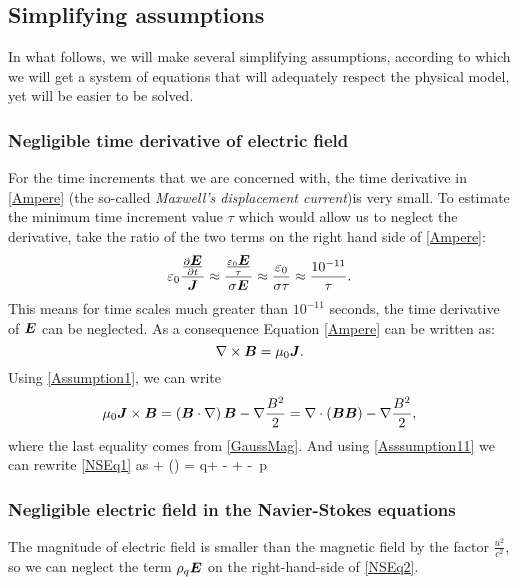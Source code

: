 \subsection{Simplifying assumptions}
In what follows, we will make several simplifying assumptions, according to which we will get a system of equations that will adequately respect the physical model, yet will be easier to be solved.
\subsubsection{Negligible time derivative of electric field}
For the time increments that we are concerned with, the time derivative in \ref{Ampere} (the so-called \textit{Maxwell's displacement current})is
very small. To estimate the minimum time increment value $\tau$ which would allow us to neglect the derivative, take the ratio of the two terms on the right hand side of \ref{Ampere}:
\begin{equation}
\varepsilon_0 \frac{\frac{\partial{\mbox{\boldmath $E$}}}{\partial{t}}}{\mbox{\boldmath $J$}} \approx \frac{\frac{\varepsilon_0 \mbox{\boldmath $E$}}{\tau}}{\sigma\mbox{\boldmath $E$}} \approx \frac{\varepsilon_0}{\sigma \tau} \approx \frac{10^{-11}}{\tau}.
\end{equation}
This means for time scales much greater than $10^{-11}$ seconds, the time derivative of $\mbox{\boldmath $E$}$ can be neglected. As a consequence Equation \ref{Ampere} can be written as:
\begin{equation}
\label{Assumption1} \nabla \times \mbox{\boldmath $B$} = \mu_0 \mbox{\boldmath $J$}.
\end{equation}
Using \ref{Assumption1}, we can write
\begin{equation}
\label{Asssumption11} \mu_0 \mbox{\boldmath $J$} \times \mbox{\boldmath $B$} = \left(\mbox{\boldmath $B$}\cdot\nabla\right)\mbox{\boldmath $B$} - \nabla\frac{B^2}{2} = \nabla\cdot\left(\mbox{\boldmath $B$}\mbox{\boldmath $B$}\right) - \nabla\frac{B^2}{2},
\end{equation}
where the last equality comes from \ref{GaussMag}. And using \ref{Asssumption11} we can rewrite \ref{NSEq1} as
\be
\label{NSEq2}  + \nabla\cdot\left(\bfpi\otimes\bfu\right) =  q\bfE + \nabla\cdot\lo{}\bfB\bfB - \ro + \rho\bfg - \nabla\,p
\ee

\subsubsection{Negligible electric field in the Navier-Stokes equations}
The magnitude of electric field is smaller than the magnetic field by the factor $\frac{u^2}{c^2}$, so we can neglect the term $\rho_q\mbox{\boldmath $E$}$ on the right-hand-side of \ref{NSEq2}.

